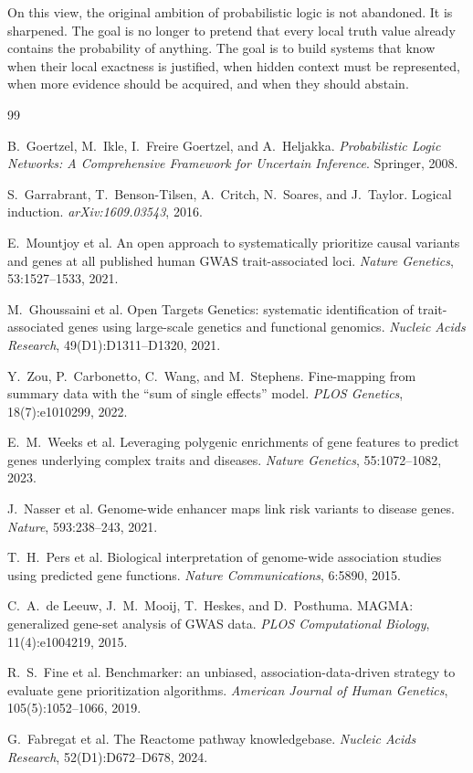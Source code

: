 \documentclass[11pt]{article}
\begin{document}
On this view, the original ambition of probabilistic logic is not abandoned. It is sharpened. The goal is no longer to pretend that every local truth value already contains the probability of anything. The goal is to build systems that know when their local exactness is justified, when hidden context must be represented, when more evidence should be acquired, and when they should abstain.

\begin{thebibliography}{99}

B.~Goertzel, M.~Ikle, I.~Freire Goertzel, and A.~Heljakka.
\newblock \emph{Probabilistic Logic Networks: A Comprehensive Framework for Uncertain Inference}.
\newblock Springer, 2008.

S.~Garrabrant, T.~Benson-Tilsen, A.~Critch, N.~Soares, and J.~Taylor.
\newblock Logical induction.
\newblock \emph{arXiv:1609.03543}, 2016.

E.~Mountjoy et al.
\newblock An open approach to systematically prioritize causal variants and genes at all published human GWAS trait-associated loci.
\newblock \emph{Nature Genetics}, 53:1527--1533, 2021.

M.~Ghoussaini et al.
\newblock Open Targets Genetics: systematic identification of trait-associated genes using large-scale genetics and functional genomics.
\newblock \emph{Nucleic Acids Research}, 49(D1):D1311--D1320, 2021.

Y.~Zou, P.~Carbonetto, C.~Wang, and M.~Stephens.
\newblock Fine-mapping from summary data with the ``sum of single effects'' model.
\newblock \emph{PLOS Genetics}, 18(7):e1010299, 2022.

E.~M.~Weeks et al.
\newblock Leveraging polygenic enrichments of gene features to predict genes underlying complex traits and diseases.
\newblock \emph{Nature Genetics}, 55:1072--1082, 2023.

J.~Nasser et al.
\newblock Genome-wide enhancer maps link risk variants to disease genes.
\newblock \emph{Nature}, 593:238--243, 2021.

T.~H.~Pers et al.
\newblock Biological interpretation of genome-wide association studies using predicted gene functions.
\newblock \emph{Nature Communications}, 6:5890, 2015.

C.~A.~de Leeuw, J.~M.~Mooij, T.~Heskes, and D.~Posthuma.
\newblock MAGMA: generalized gene-set analysis of GWAS data.
\newblock \emph{PLOS Computational Biology}, 11(4):e1004219, 2015.

R.~S.~Fine et al.
\newblock Benchmarker: an unbiased, association-data-driven strategy to evaluate gene prioritization algorithms.
\newblock \emph{American Journal of Human Genetics}, 105(5):1052--1066, 2019.

G.~Fabregat et al.
\newblock The Reactome pathway knowledgebase.
\newblock \emph{Nucleic Acids Research}, 52(D1):D672--D678, 2024.

\end{thebibliography}
\end{document}
